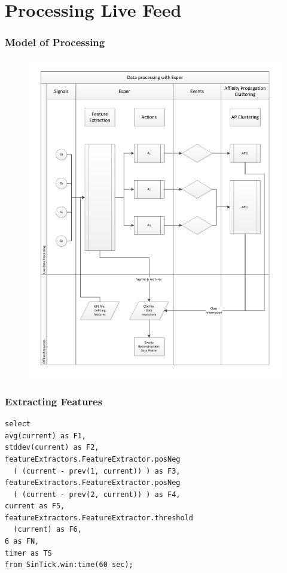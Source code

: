 \documentclass{beamer}
\begin{document}
\section{Processing Live Feed}
  \begin{frame}
    \frametitle{Model of Processing} 
    \begin{figure}[htbp]
      \includegraphics[scale=.27]{./gfx/model.pdf}
    \end{figure}
  \end{frame}

  \begin{frame}[containsverbatim]
    \frametitle{Extracting Features}
    \begin{lstlisting}
select
avg(current) as F1,
stddev(current) as F2,
featureExtractors.FeatureExtractor.posNeg
  ( (current - prev(1, current)) ) as F3,
featureExtractors.FeatureExtractor.posNeg
  ( (current - prev(2, current)) ) as F4,
current as F5,
featureExtractors.FeatureExtractor.threshold
  (current) as F6,
6 as FN,
timer as TS
from SinTick.win:time(60 sec);
    \end{lstlisting}
  \end{frame}
\end{document}
